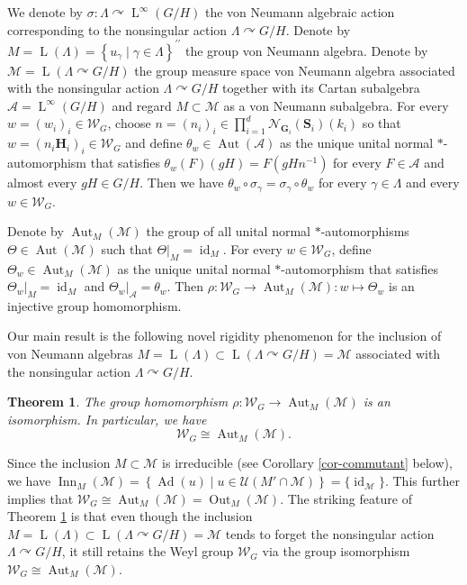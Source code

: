 \documentclass[11pt]{amsart}
\numberwithin{equation}{section}
\theoremstyle{plain}
\newtheorem{letterthm}{Theorem}
\theoremstyle{definition}
\newcommand{\Aut}{\operatorname{Aut}}
\newcommand{\Ad}{\operatorname{Ad}}
\newcommand{\id}{\operatorname{id}}
\newcommand{\dpr}{^{\prime\prime}}
\newcommand{\rL}{\operatorname{ L}}
\newcommand{\Out}{\operatorname{Out}}
\newcommand{\Inn}{\operatorname{Inn}}
\begin{document}
We denote by $\sigma : \Lambda \curvearrowright \rL^\infty(G/H)$ the von Neumann algebraic action corresponding to the nonsingular action $\Lambda \curvearrowright G/H$. Denote by $M = \rL(\Lambda) = \left\{u_\gamma \mid \gamma \in \Lambda \right\}\dpr$ the group von Neumann algebra. Denote by $\mathscr M = \rL(\Lambda \curvearrowright G/H)$ the group measure space von Neumann algebra associated with the nonsingular action $\Lambda \curvearrowright G/H$ together with its Cartan subalgebra $\mathscr A = \rL^\infty(G/H)$ and regard $M \subset \mathscr M$ as a von Neumann subalgebra. For every $w = (w_i)_i \in \mathscr W_G$, choose $n = (n_i)_i \in \prod_{i = 1}^d \mathscr N_{\mathbf G_i}(\mathbf S_i)(k_i)$ so that $w = (n_i\mathbf H_i)_i \in \mathscr W_G$ and define $\theta_w \in \Aut(\mathscr A)$ as the unique unital normal $\ast$-automorphism that satisfies $\theta_w(F)(gH) = F(gHn^{-1})$ for every $F \in \mathscr A$ and almost every $gH \in G/H$. Then we have $\theta_w \circ \sigma_\gamma = \sigma_\gamma \circ \theta_w$ for every $\gamma \in \Lambda$ and every $w \in \mathscr W_G$.



Denote by $\Aut_M(\mathscr M)$ the group of all unital normal $\ast$-automorphisms $\Theta \in \Aut(\mathscr M)$ such that $\Theta|_M = \id_M$. For every $w \in \mathscr W_G$, define $\Theta_w \in \Aut_M(\mathscr M)$ as the unique unital normal $\ast$-automorphism that satisfies $\Theta_w|_M = \id_M$ and $\Theta_w|_{\mathscr A} = \theta_w$. Then $\rho : \mathscr W_G \to \Aut_M(\mathscr M) : w \mapsto \Theta_w$ is an injective group homomorphism. 


Our main result is the following novel rigidity phenomenon for the inclusion of von Neumann algebras $M = \rL(\Lambda) \subset \rL(\Lambda \curvearrowright G/H) = \mathscr M$ associated with the nonsingular action $\Lambda \curvearrowright G/H$.


\begin{letterthm}\label{main-theorem-weyl}
The group homomorphism $\rho : \mathscr W_G \to \Aut_M(\mathscr M)$ is an isomorphism. In particular, we have 
$$\mathscr W_G \cong \Aut_M(\mathscr M).$$
\end{letterthm}

Since the inclusion $M \subset \mathscr M$ is irreducible (see Corollary \ref{cor-commutant} below), we have $\Inn_M(\mathscr M) = \left \{ \Ad(u) \mid u \in \mathscr U(M' \cap \mathscr M) \right \} = \{\id_{\mathscr M}\}$. This further implies that $\mathscr W_G \cong \Aut_M(\mathscr M) = \Out_M(\mathscr M)$. The striking feature of Theorem \ref{main-theorem-weyl} is that even though the inclusion $M = \rL(\Lambda) \subset \rL(\Lambda \curvearrowright G/H) = \mathscr M$ tends to forget the nonsingular action $\Lambda \curvearrowright G/H$, it still retains the Weyl group $\mathscr W_G$ via the group isomorphism $\mathscr W_G \cong \Aut_M(\mathscr M)$. 
\end{document}
